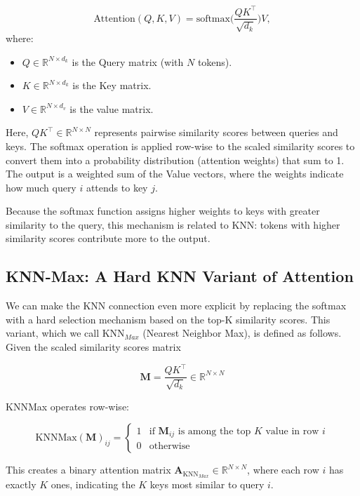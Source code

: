 \documentclass{article}
\begin{document}
\[
    \text{Attention}(Q, K, V) = \text{softmax}\!\Biggl(\frac{QK^{\top}}{\sqrt{d_k}}\Biggr)V, 
\]
where: 

\begin{itemize}
    \item \(Q \in \mathbb{R}^{N \times d_k}\) is the Query matrix (with \(N\) tokens). 
    \item \(K \in \mathbb{R}^{N \times d_k} \) is the Key matrix. 
    \item \(V \in \mathbb{R}^{N \times d_v}\) is the value matrix. 
\end{itemize}

Here, \(QK^{\top} \in \mathbb{R}^{N \times N}\) represents pairwise similarity scores between queries and keys. The softmax operation is applied row-wise to the scaled similarity scores to convert them into a probability distribution (attention weights) that sum to 1. The output is a weighted sum of the Value vectors, where the weights indicate how much query \(i\) attends to key \(j\). 

Because the softmax function assigns higher weights to keys with greater similarity to the query, this mechanism is related to KNN: tokens with higher similarity scores contribute more to the output. 

\subsection*{KNN-Max: A Hard KNN Variant of Attention}
We can make the KNN connection even more explicit by replacing the softmax with a hard selection mechanism based on the top-K similarity scores. This variant, which we call \(\text{KNN}_{Max}\) (Nearest Neighbor Max), is defined as follows. Given the scaled similarity scores matrix

\[
    \mathbf{M} = \frac{QK^{\top}}{\sqrt{d_k}} \in \mathbb{R}^{N \times N}
\]

KNNMax operates row-wise: 

\[
\text{KNNMax}(\mathbf{M})_{ij} = 
\begin{cases}
    1 & \text{if } \mathbf{M}_{ij} \text{ is among the top } K \text{ value in row } i \\
    0 & \text{otherwise}
\end{cases}
\]

This creates a binary attention matrix \(\mathbf{A}_{\text{KNN}_{Max}} \in \mathbb{R}^{N \times N}\), where each row \(i\) has exactly \(K\) ones, indicating the \(K\) keys most similar to query \(i\).
\end{document}
